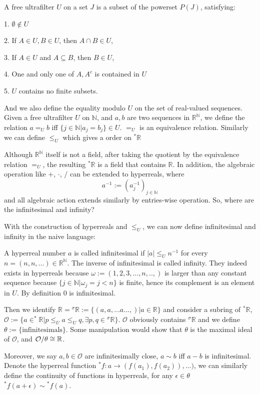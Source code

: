 \documentclass[11pt]{article}
\begin{document}
	A free ultrafilter $U$ on a set $J$ is a subset of the powerset $P(J)$, satisfying:

1.  $\emptyset\notin U$

2.	If $A\in U, B\in U$, then $A\cap B\in U$,

3.	If $A\in U$ and $A\subseteq B$, then $B\in U$,

4.	One and only one of $A, A^c$ is contained in $U$

5.	$U$ contains no finite subsets.

And we also define the equality modulo $U$ on the set of real-valued sequences. Given a free ultrafilter $U$ on $\mathbb{N}$,  and $a,b$ are two sequences in $\mathbb{R}^\mathbb{N}$, we define the relation $a=_U b$ iff $\{j\in\mathbb{N}|a_j=b_j\}\in U$. $=_U$ is an equivalence relation. Similarly we can define $\leq_U$ which gives a order on $^*\mathbb{R}$

Although $\mathbb{R}^\mathbb{N}$ itself is not a field, after taking the quotient by the equivalence relation $=_U$, the resulting $^*\mathbb{R}$ is a field that contains $\mathbb{R}$. In addition, the algebraic operation like $+$, $\cdot$, $/$ can be extended to hyperreals, where 
$$
a^{-1}:=(a_j^{-1})_{j\in\mathbb{N}}
$$
and all algebraic action extends similarly by entries-wise operation. So, where are the infinitesimal and infinity?

With the construction of hyperreals and $\leq _U$, we can now define infinitesimal and infinity in the naive language:

A hyperreal number $a$ is called infinitesimal if $|a|\leq_U n^{-1}$ for every $n=(n,n,...)\in \mathbb{R}^\mathbb{N}$. The inverse of infinitesimal is called infinity. They indeed exists in hyperreals because $\omega:=(1,2,3,...,n,..,)$ is larger than any constant sequence because $\{j\in\mathbb{N}|\omega_j=j< n\}$ is finite, hence its complement is an element in $U$. By definition $0$ is infinitesimal.

Then we identify $\mathbb{R}={^\sigma\mathbb{R}}:=\{(a,a,...a...,)|a\in\mathbb{R}\}$ and consider a subring of ${^*\mathbb{R}}$, $\mathcal{O}:=\{a\in^*\mathbb{R}|p\leq_U a\leq_U q, \exists p,q\in {^\sigma\mathbb{R}}\}$. $\mathcal{O}$ obviously contains ${^\sigma\mathbb{R}}$ and we define $\theta:=\{\text{infinitesimals}\}$. Some manipulation would show that $\theta$ is the maximal ideal of $\mathcal{O}$, and ${\cal O}/\theta\cong \mathbb{R}$. 

Moreover, we say $a,b\in\mathcal{O}$ are infinitesimally close, $a\sim b$ iff $a-b$ is infinitesimal. Denote the hyperreal function ${^*f}:a\longrightarrow (f(a_1),f(a_2)),...)$, we can similarly define the continuity of functions in hyperreals, for any $\epsilon\in\theta$ ${^* f}(a+\epsilon)\sim {^* f}(a)$.
\end{document}
